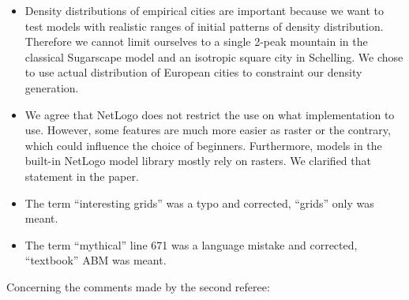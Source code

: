 \documentclass[11pt,a4paper,sans]{moderncv}        %
\begin{document}
\begin{itemize}
	\item Density distributions of empirical cities are important because we want to test models with realistic ranges of initial patterns of density distribution. Therefore we cannot limit ourselves to a single 2-peak mountain in the classical Sugarscape model and an isotropic square city in Schelling. We chose to use actual distribution of European cities to constraint our density generation.
		
	
	\item We agree that NetLogo does not restrict the use on what implementation to use. However, some features are much more easier as raster or the contrary, which could influence the choice of beginners. Furthermore, models in the built-in NetLogo model library mostly rely on rasters. We clarified that statement in the paper.
	
	\item The term ``interesting grids'' was a typo and corrected, ``grids'' only was meant.
	
	\item The term ``mythical'' line 671 was a language mistake and corrected, ``textbook'' ABM was meant.
\end{itemize}




Concerning the comments made by the second referee:

\end{document}
